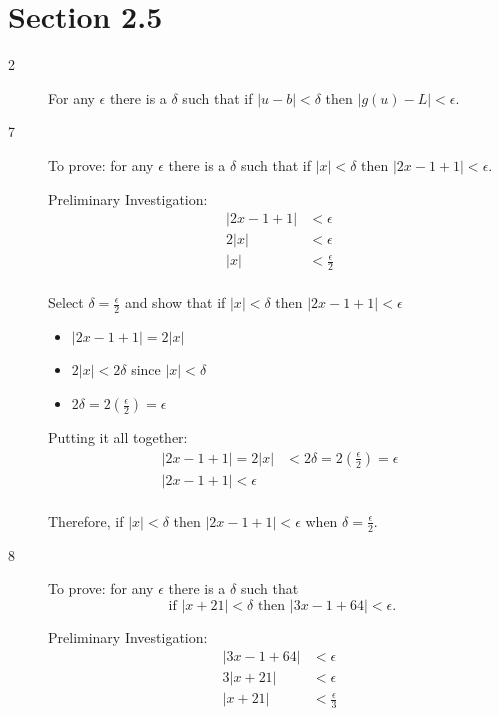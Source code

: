 \documentclass{exam}
\begin{document}
  \section{Section 2.5}
  \begin{description}

  \item[2]

  For any $\epsilon$ there is a $\delta$ such that if $|u - b| < \delta$ then $|g(u) - L| < \epsilon$.

  \item[7]
  To prove: for any $\epsilon$ there is a $\delta$ such that if $|x| < \delta$ then $|2x - 1 + 1| < \epsilon$.

  Preliminary Investigation:
  \begin{align*}
    |2x - 1 + 1| &< \epsilon \\
    2|x| &< \epsilon \\
    |x| &< \frac{\epsilon}{2} \\
  \end{align*}

  Select $\delta = \frac{\epsilon}{2}$ and show that if $|x| < \delta$ then $|2x - 1 + 1| < \epsilon$

  \begin{itemize}
    \item $|2x - 1 + 1| = 2|x|$
    \item $2|x| < 2 \delta$ since $|x| < \delta$
    \item $2 \delta = 2 \left( \frac{\epsilon}{2} \right) = \epsilon$
  \end{itemize}

  Putting it all together:
  \begin{align*}
    |2x - 1 + 1| = 2|x| &< 2 \delta = 2 \left( \frac{\epsilon}{2} \right) = \epsilon \\
    |2x - 1 + 1| < \epsilon \\
  \end{align*}

  Therefore, if $|x| < \delta$ then $|2x - 1 + 1| < \epsilon$ when $\delta = \frac{\epsilon}{2}$.

  \item[8]
  To prove: for any $\epsilon$ there is a $\delta$ such that 
  \[
    \text{ if } |x + 21| < \delta \text{ then } |3x - 1 + 64| < \epsilon.
  \]

  Preliminary Investigation:
  \begin{align*}
    |3x - 1 + 64| &< \epsilon \\
    3|x + 21| &< \epsilon \\
    |x + 21| &< \frac{\epsilon}{3} \\
  \end{align*}


\end{description}
\end{document}
